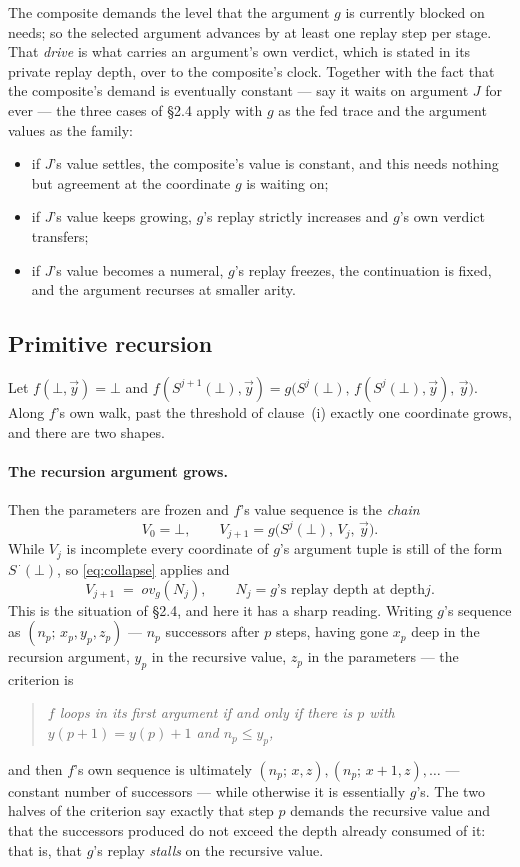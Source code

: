 \documentclass[11pt]{article}
\newcommand{\ovv}{\mathit{ov}}
\theoremstyle{definition}
\begin{document}
The composite demands the level that the argument $g$ is currently blocked
on needs; so the selected argument advances by at least one replay step
per stage. That \emph{drive} is what carries an argument's own verdict,
which is stated in its private replay depth, over to the composite's
clock. Together with the fact that the composite's demand is eventually
constant --- say it waits on argument $J$ for ever --- the three cases
of \S2.4 apply with $g$ as the fed trace and the argument values as the
family:
\begin{itemize}
\item if $J$'s value settles, the composite's value is constant, and this
  needs nothing but agreement at the coordinate $g$ is waiting on;
\item if $J$'s value keeps growing, $g$'s replay strictly increases and
  $g$'s own verdict transfers;
\item if $J$'s value becomes a numeral, $g$'s replay freezes, the
  continuation is fixed, and the argument recurses at smaller arity.
\end{itemize}

\subsection{Primitive recursion}

Let $f(\bot,\vec y) = \bot$ and
$f(S^{j+1}(\bot),\vec y) = g\bigl(S^j(\bot),\,f(S^j(\bot),\vec y),\,\vec y\bigr)$.
Along $f$'s own walk, past the threshold of clause~(i) exactly one
coordinate grows, and there are two shapes.

\paragraph{The recursion argument grows.} Then the parameters are frozen
and $f$'s value sequence is the \emph{chain}
\[
V_0 = \bot, \qquad
V_{j+1} = g\bigl(S^j(\bot),\,V_j,\,\vec y\bigr).
\]
While $V_j$ is incomplete every coordinate of $g$'s argument tuple is
still of the form $S^{\,\cdot}(\bot)$, so \eqref{eq:collapse} applies and
\[
V_{j+1} \;=\; \ovv_g(N_j), \qquad N_j = \text{$g$'s replay depth at depth
$j$} .
\]
This is the situation of \S2.4, and here it has a sharp reading. Writing
$g$'s sequence as $(n_p;\,x_p,y_p,z_p)$ --- $n_p$ successors after $p$
steps, having gone $x_p$ deep in the recursion argument, $y_p$ in the
recursive value, $z_p$ in the parameters --- the criterion is
\begin{quote}
\emph{$f$ loops in its first argument if and only if there is $p$ with
$y(p{+}1) = y(p)+1$ and $n_p \le y_p$,}
\end{quote}
and then $f$'s own sequence is ultimately $(n_p;\,x,z),(n_p;\,x{+}1,z),\dots$
--- constant number of successors --- while otherwise it is essentially
$g$'s. The two halves of the criterion say exactly that step $p$ demands
the recursive value and that the successors produced do not exceed the
depth already consumed of it: that is, that $g$'s replay \emph{stalls} on
the recursive value.
\end{document}
